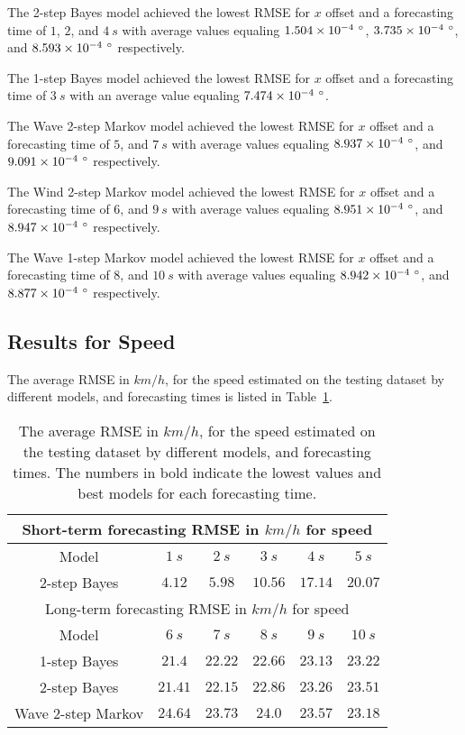 \documentclass[preprint,12pt]{elsarticle}
\begin{document}
The 2-step Bayes model achieved the lowest RMSE for $x$ offset and a forecasting time of $1$, $2$, and $4 \ s$ with average values equaling $1.504 \times 10^{-4} \ \degree$, $3.735 \times 10^{-4} \ \degree$, and $8.593 \times 10^{-4} \ \degree$ respectively.

The 1-step Bayes model achieved the lowest RMSE for $x$ offset and a forecasting time of $3 \ s$ with an average value equaling $7.474 \times 10^{-4} \ \degree$.

The Wave 2-step Markov model achieved the lowest RMSE for $x$ offset and a forecasting time of $5$, and $7 \ s$ with average values equaling $8.937 \times 10^{-4} \ \degree$, and $9.091 \times 10^{-4} \ \degree$ respectively.

The Wind 2-step Markov model achieved the lowest RMSE for $x$ offset and a forecasting time of $6$, and $9 \ s$ with average values equaling $8.951 \times 10^{-4} \ \degree$, and $8.947 \times 10^{-4} \ \degree$ respectively.

The Wave 1-step Markov model achieved the lowest RMSE for $x$ offset and a forecasting time of $8$, and $10 \ s$ with average values equaling $8.942 \times 10^{-4} \ \degree$, and $8.877 \times 10^{-4} \ \degree$ respectively.

\subsection{Results for Speed}

The average RMSE in $km/h$, for the speed estimated on the testing dataset by different models, and forecasting times is listed in Table~\ref{tab:best_speed_RMSE}.

\begin{table}[!ht]
	\centering
	\begin{tabular}{|c|c|c|c|c|c|}
		\hline
		\multicolumn{6}{|c|}{Short-term forecasting RMSE in $km/h$ for speed} \\ \hline
		Model & $1 \ s$ & $2 \ s$ & $3 \ s$ & $4 \ s$ & $5 \ s$ \\ \hline
		2-step Bayes & $\mathbf{4.12}$ & $\mathbf{5.98}$ & $\mathbf{10.56}$ & $\mathbf{17.14}$ & $\mathbf{20.07}$ \\ \hline
		\multicolumn{6}{|c|}{Long-term forecasting RMSE in $km/h$ for speed} \\ \hline
		Model & $6 \ s$ & $7 \ s$ & $8 \ s$ & $9 \ s$ & $10 \ s$ \\ \hline
		1-step Bayes & $\mathbf{21.4}$ & $22.22$ & $\mathbf{22.66}$ & $\mathbf{23.13}$ & $23.22$ \\ \hline
		2-step Bayes & $21.41$ & $\mathbf{22.15}$ & $22.86$ & $23.26$ & $23.51$ \\ \hline
		Wave 2-step Markov & $24.64$ & $23.73$ & $24.0$ & $23.57$ & $\mathbf{23.18}$ \\ \hline
	\end{tabular}
	\caption{The average RMSE in $km/h$, for the speed estimated on the testing dataset by different models, and forecasting times. The numbers in bold indicate the lowest values and best models for each forecasting time.}
	\label{tab:best_speed_RMSE}
\end{table}
\end{document}
